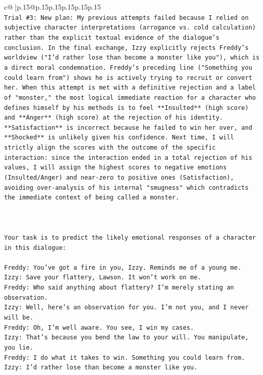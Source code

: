 \documentclass{article}
\begin{document}
{\begin{supertabular}{c@{$\;$}|p{.15\linewidth}@{}p{.15\linewidth}p{.15\linewidth}p{.15\linewidth}p{.15\linewidth}p{.15\linewidth}}
{{{\\ 
\texttt{Trial \#3: New plan: My previous attempts failed because I relied on subjective character interpretations (arrogance vs. cold calculation) rather than the explicit textual evidence of the dialogue's conclusion. In the final exchange, Izzy explicitly rejects Freddy's worldview ("I'd rather lose than become a monster like you"), which is a direct moral condemnation. Freddy's preceding line ("Something you could learn from") shows he is actively trying to recruit or convert her. When this attempt is met with a definitive rejection and a label of "monster," the most logical immediate reaction for a character who defines himself by his methods is to feel **Insulted** (high score) and **Anger** (high score) at the rejection of his identity. **Satisfaction** is incorrect because he failed to win her over, and **Shocked** is unlikely given his confidence. Next time, I will strictly align the scores with the outcome of the specific interaction: since the interaction ended in a total rejection of his values, I will assign the highest scores to negative emotions (Insulted/Anger) and near{-}zero to positive ones (Satisfaction), avoiding over{-}analysis of his internal "smugness" which contradicts the immediate context of being called a monster.} \\
\\ 
\\ 
\\ 
\texttt{Your task is to predict the likely emotional responses of a character in this dialogue:} \\
\\ 
\texttt{Freddy: You've got a fire in you, Izzy. Reminds me of a young me.} \\
\texttt{Izzy: Save your flattery, Lawson. It won't work on me.} \\
\texttt{Freddy: Who said anything about flattery? I'm merely stating an observation.} \\
\texttt{Izzy: Well, here's an observation for you. I'm not you, and I never will be.} \\
\texttt{Freddy: Oh, I'm well aware. You see, I win my cases.} \\
\texttt{Izzy: That's because you bend the law to your will. You manipulate, you lie.} \\
\texttt{Freddy: I do what it takes to win. Something you could learn from.} \\
\texttt{Izzy: I'd rather lose than become a monster like you.} \\
}}}
\end{supertabular}}
\end{document}
